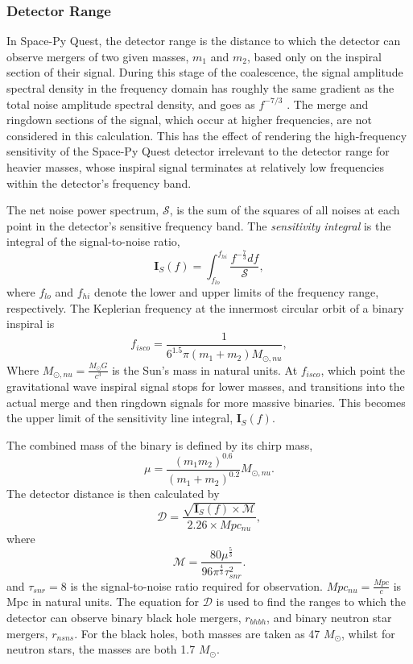 \documentclass{article}
\begin{document}
\subsubsection{Detector Range}
In Space-Py Quest, the detector range is the distance to which the detector can observe mergers of two given masses, $m_1$ and $m_2$, based only on the inspiral section of their signal. During this stage of the coalescence, the signal amplitude spectral density in the frequency domain has roughly the same gradient as the total noise amplitude spectral density, and goes as $f^{-7/3}$ \cite{ajith}. The merge and ringdown sections of the signal, which occur at higher frequencies, are not considered in this calculation. This has the effect of rendering the high-frequency sensitivity of the Space-Py Quest detector irrelevant to the detector range for heavier masses, whose inspiral signal terminates at relatively low frequencies within the detector's frequency band.
\par 
The net noise power spectrum, $\mathcal{S}$, is the sum of the squares of all noises at each point in the detector's sensitive frequency band.
    The \textit{sensitivity integral} is the integral of the signal-to-noise ratio,
    \[
    \mathbf{I}_S(f) = \int_{f_{lo}}^{f_{hi}} \frac{f^{-\frac{7}{3}}df}{\mathcal{S}},
    \]
    where $f_{lo}$ and $f_{hi}$ denote the lower and upper limits of the frequency range, respectively.
    The Keplerian frequency at the innermost circular orbit of a binary inspiral is
    \begin{equation}
    \label{eq:isco}
    f_{isco} = \frac{1}{6^{1.5}\pi(m_1+m_2)M_{\odot,nu}},
    \end{equation}
    Where $M_{\odot,nu} = \frac{M_{\odot}G}{c^3}$ is the Sun's mass in natural units. At $f_{isco}$, which point the gravitational wave inspiral signal stops for lower masses, and transitions into the actual merge and then ringdown signals for more massive binaries. This becomes the upper limit of the sensitivity line integral, $\mathbf{I}_S(f)$.
    \par
    The combined mass of the binary is defined by its chirp mass,
    \[
    \mu = \frac{(m_1m_2)^{0.6}}{(m_1 + m_2)^{0.2}}M_{\odot,nu}.
    \]
    The detector distance is then calculated by
    \[
    \mathcal{D} = \frac{\sqrt{\mathbf{I}_S(f) \times \mathcal{M}}}{2.26 \times Mpc_{nu}},
    \]
    where
    \[
    \mathcal{M} = \frac{80\mu^{\frac{5}{3}}}{96\pi^{\frac{4}{3}}\tau_{snr}^2}.
    \]
   and $\tau_{snr} = 8$ is the signal-to-noise ratio required for observation. $Mpc_{nu} = \frac{Mpc}{c}$ is Mpc in natural units. The equation for $\mathcal{D}$ is used to find the ranges to which the detector can observe binary black hole mergers, $r_{bhbh}$, and binary neutron star mergers, $r_{nsns}$. For the black holes, both masses are taken as 47 $M_{\odot}$, whilst for neutron stars, the masses are both 1.7 $M_{\odot}$.
\end{document}
